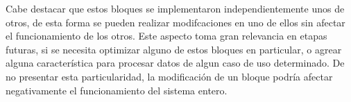 Cabe destacar que estos bloques se implementaron independientemente unos de otros, de esta forma se pueden realizar modifcaciones en uno de ellos sin afectar el funcionamiento de los otros. Este aspecto toma gran relevancia en etapas futuras, si se necesita optimizar alguno de estos bloques en particular, o agrear alguna característica para procesar datos de algun caso de uso determinado. De no presentar esta particularidad, la modificación de un bloque podría afectar negativamente el funcionamiento del sistema entero.

\begin{figure}[H]
        \centering
        \hspace{3 mm}


\end{figure}
